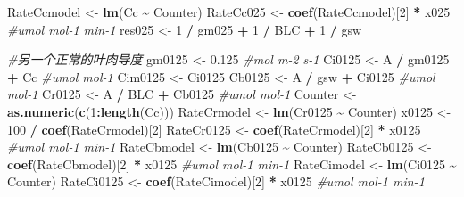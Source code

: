 \documentclass[
]{krantz}
\makeatletter
\newenvironment{Shaded}{\begin{snugshade}}{\end{snugshade}}
\newcommand{\CommentTok}[1]{\textcolor[rgb]{0.56,0.35,0.01}{\textit{#1}}}
\newcommand{\DecValTok}[1]{\textcolor[rgb]{0.00,0.00,0.81}{#1}}
\newcommand{\FloatTok}[1]{\textcolor[rgb]{0.00,0.00,0.81}{#1}}
\newcommand{\KeywordTok}[1]{\textcolor[rgb]{0.13,0.29,0.53}{\textbf{#1}}}
\newcommand{\NormalTok}[1]{#1}
\newcommand{\OperatorTok}[1]{\textcolor[rgb]{0.81,0.36,0.00}{\textbf{#1}}}
\newcommand{\StringTok}[1]{\textcolor[rgb]{0.31,0.60,0.02}{#1}}
\newenvironment{kframe}{%
\medskip{}
\setlength{\fboxsep}{.8em}
 \def\at@end@of@kframe{}%
 \ifinner\ifhmode%
  \def\at@end@of@kframe{\end{minipage}}%
  \begin{minipage}{\columnwidth}%
 \fi\fi%
 \def\FrameCommand##1{\hskip\@totalleftmargin \hskip-\fboxsep
 \colorbox{shadecolor}{##1}\hskip-\fboxsep
     \hskip-\linewidth \hskip-\@totalleftmargin \hskip\columnwidth}%
 \MakeFramed {\advance\hsize-\width
   \@totalleftmargin\z@ \linewidth\hsize
   \@setminipage}}%
 {\par\unskip\endMakeFramed%
 \at@end@of@kframe}
\renewenvironment{Shaded}{\begin{kframe}}{\end{kframe}}
\makeatother
\begin{document}
\begin{Shaded}
\begin{Highlighting}[]
\NormalTok{RateCcmodel \textless{}{-}}\StringTok{ }\KeywordTok{lm}\NormalTok{(Cc }\OperatorTok{\textasciitilde{}}\StringTok{ }\NormalTok{Counter)}
\NormalTok{RateCc025 \textless{}{-}}\StringTok{ }\KeywordTok{coef}\NormalTok{(RateCcmodel)[}\DecValTok{2}\NormalTok{] }\OperatorTok{*}\StringTok{ }\NormalTok{x025 }\CommentTok{\#umol mol{-}1 min{-}1}
\NormalTok{res025 \textless{}{-}}\StringTok{ }\DecValTok{1} \OperatorTok{/}\StringTok{ }\NormalTok{gm025 }\OperatorTok{+}\StringTok{ }\DecValTok{1} \OperatorTok{/}\StringTok{ }\NormalTok{BLC }\OperatorTok{+}\StringTok{ }\DecValTok{1} \OperatorTok{/}\StringTok{ }\NormalTok{gsw}

\CommentTok{\#另一个正常的叶肉导度}
\NormalTok{gm0125 \textless{}{-}}\StringTok{ }\FloatTok{0.125} \CommentTok{\#mol m{-}2 s{-}1}
\NormalTok{Ci0125 \textless{}{-}}\StringTok{ }\NormalTok{A }\OperatorTok{/}\StringTok{ }\NormalTok{gm0125 }\OperatorTok{+}\StringTok{ }\NormalTok{Cc }\CommentTok{\#umol mol{-}1}
\NormalTok{Cim0125 \textless{}{-}}\StringTok{ }\NormalTok{Ci0125}
\NormalTok{Cb0125 \textless{}{-}}\StringTok{ }\NormalTok{A }\OperatorTok{/}\StringTok{ }\NormalTok{gsw }\OperatorTok{+}\StringTok{ }\NormalTok{Ci0125 }\CommentTok{\#umol mol{-}1}
\NormalTok{Cr0125 \textless{}{-}}\StringTok{ }\NormalTok{A }\OperatorTok{/}\StringTok{ }\NormalTok{BLC }\OperatorTok{+}\StringTok{ }\NormalTok{Cb0125 }\CommentTok{\#umol mol{-}1}
\NormalTok{Counter \textless{}{-}}\StringTok{ }\KeywordTok{as.numeric}\NormalTok{(}\KeywordTok{c}\NormalTok{(}\DecValTok{1}\OperatorTok{:}\KeywordTok{length}\NormalTok{(Cc)))}
\NormalTok{RateCrmodel \textless{}{-}}\StringTok{ }\KeywordTok{lm}\NormalTok{(Cr0125 }\OperatorTok{\textasciitilde{}}\StringTok{ }\NormalTok{Counter)}
\NormalTok{x0125 \textless{}{-}}\StringTok{ }\DecValTok{100} \OperatorTok{/}\StringTok{ }\KeywordTok{coef}\NormalTok{(RateCrmodel)[}\DecValTok{2}\NormalTok{]}
\NormalTok{RateCr0125 \textless{}{-}}\StringTok{ }\KeywordTok{coef}\NormalTok{(RateCrmodel)[}\DecValTok{2}\NormalTok{] }\OperatorTok{*}\StringTok{ }\NormalTok{x0125 }\CommentTok{\#umol mol{-}1 min{-}1}
\NormalTok{RateCbmodel \textless{}{-}}\StringTok{ }\KeywordTok{lm}\NormalTok{(Cb0125 }\OperatorTok{\textasciitilde{}}\StringTok{ }\NormalTok{Counter)}
\NormalTok{RateCb0125 \textless{}{-}}\StringTok{ }\KeywordTok{coef}\NormalTok{(RateCbmodel)[}\DecValTok{2}\NormalTok{] }\OperatorTok{*}\StringTok{ }\NormalTok{x0125 }\CommentTok{\#umol mol{-}1 min{-}1}
\NormalTok{RateCimodel \textless{}{-}}\StringTok{ }\KeywordTok{lm}\NormalTok{(Ci0125 }\OperatorTok{\textasciitilde{}}\StringTok{ }\NormalTok{Counter)}
\NormalTok{RateCi0125 \textless{}{-}}\StringTok{ }\KeywordTok{coef}\NormalTok{(RateCimodel)[}\DecValTok{2}\NormalTok{] }\OperatorTok{*}\StringTok{ }\NormalTok{x0125 }\CommentTok{\#umol mol{-}1 min{-}1}

\end{Highlighting}
\end{Shaded}
\end{document}
